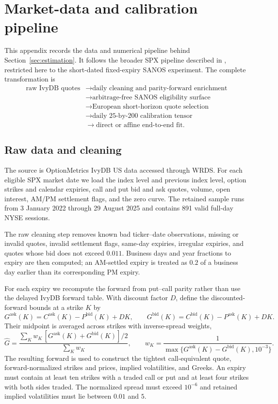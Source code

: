 \section{Market-data and calibration pipeline}
\label{app:market-pipeline}

This appendix records the data and numerical pipeline behind
Section~\ref{sec:estimation}. It follows the broader SPX pipeline described in
\cite{DYSANOS2026}, restricted here to the short-dated fixed-expiry SANOS
experiment. The complete transformation is
\[
\begin{aligned}
\text{raw IvyDB quotes}
&\longrightarrow \text{daily cleaning and parity-forward enrichment}\\
&\longrightarrow \text{arbitrage-free SANOS eligibility surface}\\
&\longrightarrow \text{European short-horizon quote selection}\\
&\longrightarrow \text{daily 25-by-200 calibration tensor}\\
&\longrightarrow \text{direct or affine end-to-end fit}.
\end{aligned}
\]

\subsection{Raw data and cleaning}
\label{app:pipeline-raw}

The source is OptionMetrics IvyDB US data accessed through WRDS. For each
eligible SPX market date we load the index level and previous index level,
option strikes and calendar expiries, call and put bid and ask quotes, volume,
open interest, AM/PM settlement flags, and the zero curve. The retained sample
runs from 3 January 2022 through 29 August 2025 and contains 891 valid full-day
NYSE sessions.

The raw cleaning step removes known bad ticker--date observations, missing or
invalid quotes, invalid settlement flags, same-day expiries, irregular
expiries, and quotes whose bid does not exceed $0.011$. Business days and year
fractions to expiry are then computed; an AM-settled expiry is treated as
$0.2$ of a business day earlier than its corresponding PM expiry.

For each expiry we recompute the forward from put--call parity rather than use
the delayed IvyDB forward table. With discount factor $D$, define the
discounted-forward bounds at a strike $K$ by
\[
  G^{\mathrm{ask}}(K)=C^{\mathrm{ask}}(K)-P^{\mathrm{bid}}(K)+DK,
  \qquad
  G^{\mathrm{bid}}(K)=C^{\mathrm{bid}}(K)-P^{\mathrm{ask}}(K)+DK.
\]
Their midpoint is averaged across strikes with inverse-spread weights,
\[
  \widehat G
  =\frac{\sum_K w_K\,[G^{\mathrm{ask}}(K)+G^{\mathrm{bid}}(K)]/2}
         {\sum_K w_K},
  \qquad
  w_K=\frac1{\max\{G^{\mathrm{ask}}(K)-G^{\mathrm{bid}}(K),10^{-3}\}}.
\]
The resulting forward is used to construct the tightest call-equivalent quote,
forward-normalized strikes and prices, implied volatilities, and Greeks. An
expiry must contain at least ten strikes with a traded call or put and at least
four strikes with both sides traded. The normalized spread must exceed
$10^{-6}$ and retained implied volatilities must lie between $0.01$ and $5$.

